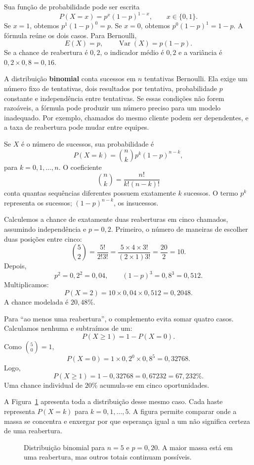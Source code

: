 Sua função de probabilidade pode ser escrita
\[
P(X=x)=p^x(1-p)^{1-x},\qquad x\in\{0,1\}.
\]
Se $x=1$, obtemos $p^1(1-p)^0=p$. Se $x=0$, obtemos $p^0(1-p)^1=1-p$. A fórmula reúne os dois casos. Para Bernoulli,
\[
E(X)=p,
\qquad
\operatorname{Var}(X)=p(1-p).
\]
Se a chance de reabertura é $0{,}2$, o indicador médio é $0{,}2$ e a variância é $0{,}2\times0{,}8=0{,}16$.

A distribuição \textbf{binomial} conta sucessos em $n$ tentativas Bernoulli. Ela exige um número fixo de tentativas, dois resultados por tentativa, probabilidade $p$ constante e independência entre tentativas. Se essas condições não forem razoáveis, a fórmula pode produzir um número preciso para um modelo inadequado. Por exemplo, chamados do mesmo cliente podem ser dependentes, e a taxa de reabertura pode mudar entre equipes.

Se $X$ é o número de sucessos, sua probabilidade é
\[
P(X=k)=\binom{n}{k}p^k(1-p)^{n-k},
\]
para $k=0,1,\ldots,n$. O coeficiente
\[
\binom{n}{k}=\frac{n!}{k!(n-k)!}
\]
conta quantas sequências diferentes possuem exatamente $k$ sucessos. O termo $p^k$ representa os sucessos; $(1-p)^{n-k}$, os insucessos.

Calculemos a chance de exatamente duas reaberturas em cinco chamados, assumindo independência e $p=0{,}2$. Primeiro, o número de maneiras de escolher duas posições entre cinco:
\[
\binom52=\frac{5!}{2!3!}
=\frac{5\times4\times3!}{(2\times1)3!}
=\frac{20}{2}=10.
\]
Depois,
\[
p^2=0{,}2^2=0{,}04,
\qquad
(1-p)^3=0{,}8^3=0{,}512.
\]
Multiplicamos:
\[
P(X=2)=10\times0{,}04\times0{,}512=0{,}2048.
\]
A chance modelada é $20{,}48\%$.

Para ``ao menos uma reabertura'', o complemento evita somar quatro casos. Calculamos nenhuma e subtraímos de um:
\[
P(X\geq1)=1-P(X=0).
\]
Como $\binom50=1$,
\[
P(X=0)=1\times0{,}2^0\times0{,}8^5=0{,}32768.
\]
Logo,
\[
P(X\geq1)=1-0{,}32768=0{,}67232=67{,}232\%.
\]
Uma chance individual de $20\%$ acumula-se em cinco oportunidades.

A Figura~\ref{fig:binomial-reaberturas} apresenta toda a distribuição desse mesmo caso. Cada haste representa $P(X=k)$ para $k=0,1,\ldots,5$. A figura permite comparar onde a massa se concentra e enxergar por que esperança igual a um não significa certeza de uma reabertura.

\begin{figure}[htbp]
\centering
{}
\caption{Distribuição binomial para $n=5$ e $p=0{,}20$. A maior massa está em uma reabertura, mas outros totais continuam possíveis.}
\label{fig:binomial-reaberturas}
\end{figure}

